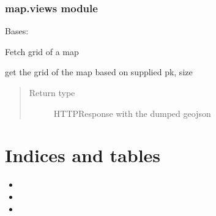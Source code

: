 \documentclass[letterpaper,10pt,english]{sphinxmanual}
\begin{document}
\subsection{map.views module}
\label{api/map:map-views-module}\label{api/map:module-map.views}

\begin{fulllineitems}
\label{api/map:map.views.FetchGridView}
Bases: 

Fetch grid of a map

\begin{fulllineitems}
\label{api/map:map.views.FetchGridView.get}
get the grid of the map based on supplied pk, size
\begin{quote}\begin{description}
\item[{Return type}] \leavevmode
HTTPResponse with the dumped geojson

\end{description}\end{quote}

\end{fulllineitems}


\end{fulllineitems}



\chapter{Indices and tables}
\label{index:indices-and-tables}\begin{itemize}
\item {} 

\item {} 

\item {} 

\end{itemize}
\end{document}
